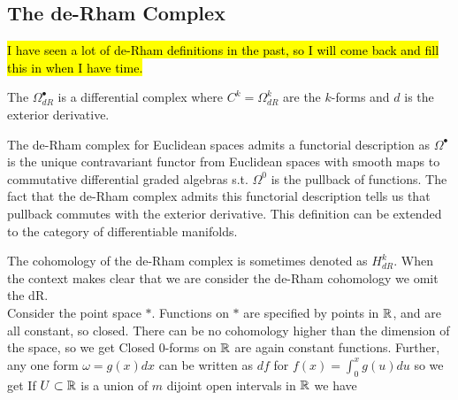 \documentclass{article}
\begin{document}
\subsection{The de-Rham Complex}
\hl{I have seen a lot of de-Rham definitions in the past, so I will come back and fill this in when I have time.}


\begin{definition}
	The  $\Omega^\bullet_{dR}$ is a differential complex where $C^k = \Omega^k_{dR}$ are the $k$-forms and $d$ is the exterior derivative. 
\end{definition}



\begin{remark}
	The de-Rham complex for Euclidean spaces admits a functorial description as $\Omega^\bullet$ is the unique contravariant functor from Euclidean spaces with smooth maps to commutative differential graded algebras s.t. $\Omega^0$ is the pullback of functions. The fact that the de-Rham complex admits this functorial description tells us that pullback commutes with the exterior derivative. This definition can be extended to the category of differentiable manifolds. 
\end{remark}



\begin{example}
	The cohomology of the de-Rham complex is sometimes denoted as $H^k_{dR}$. When the context makes clear that we are consider the de-Rham cohomology we omit the dR. \\
	Consider the point space $\ast$. Functions on $\ast$ are specified by points in $\mathbb{R}$, and are all constant, so closed. There can be no cohomology higher than the dimension of the space, so we get 
	Closed $0$-forms on $\mathbb{R}$ are again constant functions. Further, any one form $\omega = g(x)dx$ can be written as $df$ for $f(x) = \int_0^x g(u) du$ so we get 
	If $U\subset \mathbb{R}$ is a union of $m$ dijoint open intervals in $\mathbb{R}$ we have 
\end{example}
\end{document}
